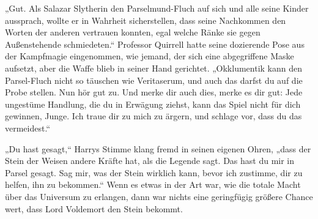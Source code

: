 „Gut. Als Salazar Slytherin den Parselmund-Fluch auf sich und alle seine Kinder aussprach, wollte er in Wahrheit sicherstellen, dass seine Nachkommen den Worten der anderen vertrauen konnten, egal welche Ränke sie gegen Außenstehende schmiedeten.“
Professor Quirrell hatte seine dozierende Pose aus der Kampfmagie eingenommen, wie jemand, der sich eine abgegriffene Maske aufsetzt, aber die Waffe blieb in seiner Hand gerichtet.
„Okklumentik kann den Parsel-Fluch nicht so täuschen wie Veritaserum, und auch das darfst du auf die Probe stellen. Nun hör gut zu.  Und merke dir auch dies, merke es dir gut:  Jede ungestüme Handlung, die du in Erwägung ziehst, kann das Spiel nicht für dich gewinnen, Junge. Ich traue dir zu mich zu ärgern, und schlage vor, dass du das vermeidest.“

„Du hast gesagt,“ Harrys Stimme klang fremd in seinen eigenen Ohren, „dass der Stein der Weisen andere Kräfte hat, als die Legende sagt. Das hast du mir in Parsel gesagt. Sag mir, was der Stein wirklich kann, bevor ich zustimme, dir zu helfen, ihn zu bekommen.“
Wenn es etwas in der Art war, wie die totale Macht über das Universum zu erlangen, dann war nichts eine geringfügig größere Chance wert, dass Lord Voldemort den Stein bekommt.


